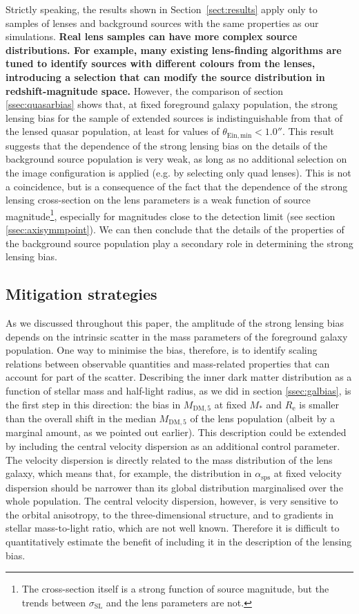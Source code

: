 \documentclass{aa}
\def\reff{R_{\mathrm{e}}}
\def\mstar{M_*}
\def\asps{\alpha_{\mathrm{sps}}}
\def\mdmfive{M_{\mathrm{DM}, 5}}
\def\crosssect{\sigma_\mathrm{{SL}}}
\def\Sref#1{Section~\ref{#1}\xspace}
\begin{document}
Strictly speaking, the results shown in \Sref{sect:results} apply only to samples of lenses and background sources with the same properties as our simulations.
{\bf Real lens samples can have more complex source distributions. For example, many existing lens-finding algorithms are tuned to identify sources with different colours from the lenses, introducing a selection that can modify the source distribution in redshift-magnitude space.
}
However, the comparison of section \ref{ssec:quasarbias} shows that, at fixed foreground galaxy population, the strong lensing bias for the sample of extended sources is indistinguishable from that of the lensed quasar population, at least for values of $\theta_{\mathrm{Ein,min}} < 1.0''$.
This result suggests that the dependence of the strong lensing bias on the details of the background source population is very weak, as long as no additional selection on the image configuration is applied (e.g. by selecting only quad lenses).
This is not a coincidence, but is a consequence of the fact that the dependence of the strong lensing cross-section on the lens parameters is a weak function of source magnitude\footnote{The cross-section itself is a strong function of source magnitude, but the trends between $\crosssect$ and the lens parameters are not.}, especially for magnitudes close to the detection limit (see section \ref{ssec:axisymmpoint}).
We can then conclude that the details of the properties of the background source population play a secondary role in determining the strong lensing bias.

\subsection{Mitigation strategies}

As we discussed throughout this paper, the amplitude of the strong lensing bias depends on the intrinsic scatter in the mass parameters of the foreground galaxy population.
One way to minimise the bias, therefore, is to identify scaling relations between observable quantities and mass-related properties that can account for part of the scatter.
Describing the inner dark matter distribution as a function of stellar mass and half-light radius, as we did in section \ref{ssec:galbias}, is the first step in this direction: the bias in $\mdmfive$ at fixed $\mstar$ and $\reff$ is smaller than the overall shift in the median $\mdmfive$ of the lens population (albeit by a marginal amount, as we pointed out earlier).
This description could be extended by including the central velocity dispersion as an additional control parameter. 
The velocity dispersion is directly related to the mass distribution of the lens galaxy, which means that, for example, the distribution in $\asps$ at fixed velocity dispersion should be narrower than its global distribution marginalised over the whole population. 
The central velocity dispersion, however, is very sensitive to the orbital anisotropy, to the three-dimensional structure, and to gradients in stellar mass-to-light ratio, which are not well known. Therefore it is difficult to quantitatively estimate the benefit of including it in the description of the lensing bias.
\end{document}
